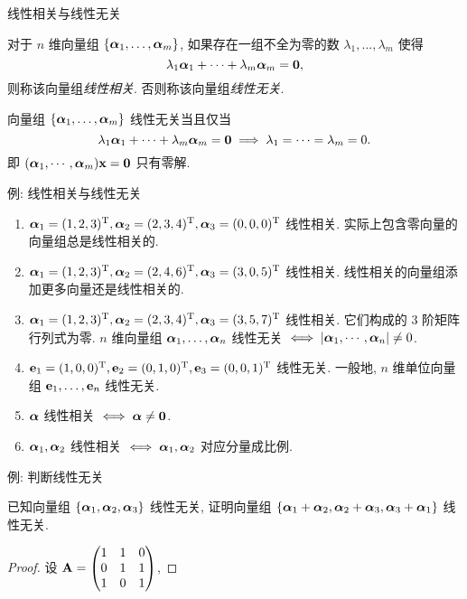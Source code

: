 \begin{frame}{线性相关与线性无关}
	\onslide<+->
	\begin{definition}
		对于 $n$ 维向量组 $\{\bma_1,\dots,\bma_m\}$,
		如果存在一组\alert{不全为零}的数 $\lambda_1,\dots,\lambda_m$ 使得
		\[\lambda_1\bma_1+\dots+\lambda_m\bma_m={\bf0},\]
		则称该向量组\emph{线性相关}.
		否则称该向量组\emph{线性无关}.
	\end{definition}
	\onslide<+->
	向量组 $\{\bma_1,\dots,\bma_m\}$ 线性无关当且仅当
	\[\lambda_1\bma_1+\dots+\lambda_m\bma_m={\bf0}\implies
	\lambda_1=\cdots=\lambda_m=0.\]
	\onslide<+->
	即 $(\bma_1,\cdots,\bma_m)\bfx={\bf0}$ 只有零解.
\end{frame}


\begin{frame}{例: 线性相关与线性无关}
	\onslide<+->
	\begin{example}
		\begin{enumerate}
			\item $\bma_1=(1,2,3)^\rmT,\bma_2=(2,3,4)^\rmT,\bma_3=(0,0,0)^\rmT$ 线性相关.
			实际上\alert{包含零向量的向量组总是线性相关的}.
			\item $\bma_1=(1,2,3)^\rmT,\bma_2=(2,4,6)^\rmT,\bma_3=(3,0,5)^\rmT$ 线性相关.
			\alert{线性相关的向量组添加更多向量还是线性相关的}.
			\item $\bma_1=(1,2,3)^\rmT,\bma_2=(2,3,4)^\rmT,\bma_3=(3,5,7)^\rmT$ 线性相关.
			它们构成的 $3$ 阶矩阵行列式为零.
			\alert{$n$ 维向量组 $\bma_1,\dots,\bma_n$ 线性无关 $\iff |\bma_1,\cdots,\bma_n|\neq 0$}.
			\item $\bfe_1=(1,0,0)^\rmT,\bfe_2=(0,1,0)^\rmT,\bfe_3=(0,0,1)^\rmT$ 线性无关.
			一般地, \alert{$n$ 维单位向量组 $\bfe_1,\dots,\bfe_n$ 线性无关}.
			\item $\bma$ 线性相关 $\iff \bma\neq{\bf0}$.
			\item $\bma_1,\bma_2$ 线性相关 $\iff \bma_1,\bma_2$ 对应分量成比例.
		\end{enumerate}
	\end{example}
\end{frame}


\begin{frame}{例: 判断线性无关}
	\onslide<+->
	\begin{example}
		已知向量组 $\{\bma_1,\bma_2,\bma_3\}$ 线性无关, 证明向量组 $\{\bma_1+\bma_2,\bma_2+\bma_3,\bma_3+\bma_1\}$ 线性无关.
	\end{example}
	\onslide<+->
	\begin{proof}
		设 $\bfA=\begin{pmatrix}
			1&1&0\\
			0&1&1\\
			1&0&1
		\end{pmatrix}$,
		\vspace{-\baselineskip}
	\end{proof}
\end{frame}



